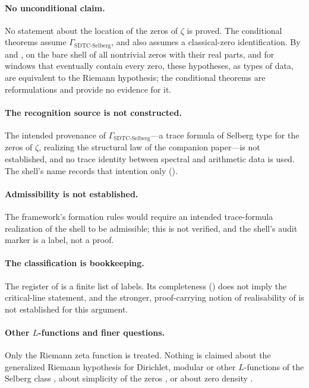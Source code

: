 \documentclass[11pt]{article}
\newcommand{\GamSDTCSelberg}{\Gamma_{\mathrm{SDTC\text{-}Selberg}}}
\theoremstyle{definition}
\begin{document}
\paragraph{No unconditional claim.}
No statement about the location of the zeros of \(\zeta\) is proved.
The conditional theorems assume \(\GamSDTCSelberg\), and
 also assumes a classical-zero
identification.  By  and
, on the bare shell of all nontrivial zeros with their real parts, and
for windows that eventually
contain every zero, these hypotheses, as types of data, are equivalent
to the Riemann hypothesis; the conditional theorems
are reformulations and provide no evidence for it.

\paragraph{The recognition source is not constructed.}
The intended provenance of \(\GamSDTCSelberg\)---a trace formula of
Selberg type for the zeros of \(\zeta\), realizing the structural law
of the companion paper---is not established, and no trace identity
between spectral and arithmetic data is used.  The shell's name
records that intention only ().

\paragraph{Admissibility is not established.}
The framework's formation rules \citep{TsiokosFoundationsII2026} would
require an intended trace-formula realization of the shell to be
admissible; this is not verified, and the shell's audit marker is a
label, not a proof.

\paragraph{The classification is bookkeeping.}
The register of  is a finite list of labels.
Its completeness () does not imply the
critical-line statement, and the stronger, proof-carrying notion of
realisability of \citet{TsiokosAOR2026} is not established for this
argument.

\paragraph{Other \(L\)-functions and finer questions.}
Only the Riemann zeta function is treated.  Nothing is claimed about
the generalized Riemann hypothesis for Dirichlet, modular or other
\(L\)-functions of the Selberg class
\citep{Selberg1992,KaczorowskiPerelli1999}, about simplicity of the
zeros \citep{Montgomery1973,ConreyGhoshGonek1998}, or about zero
density \citep{Montgomery1971,Ivic1985}.
\end{document}
